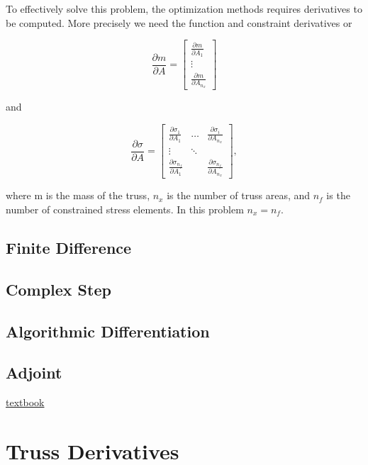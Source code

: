 \documentclass{article}
\begin{document}
To effectively solve this problem, the optimization methods requires derivatives to be computed. More precisely we need the function  and constraint derivatives or 


\begin{equation}
\frac{\partial m}{\partial A}=
\begin{bmatrix} 
\frac{\partial m}{\partial A_1} \\
\vdots \\
\frac{\partial m}{\partial A_{n_x}}
\end{bmatrix}
\end{equation}

and 

\begin{equation}
\frac{\partial \sigma}{\partial A}=
\begin{bmatrix} 
\frac{\partial \sigma_1}{\partial A_1} & \dots & \frac{\partial \sigma_i}{\partial A_{n_x}} \\
\vdots & \ddots & \\
\frac{\partial \sigma_{n_f}}{\partial A_1} &        & \frac{\partial \sigma_{n_f}}{\partial A_{n_x}} 
\end{bmatrix},
\end{equation}

where m is the mass of the truss, $n_x$ is the number of truss areas, and $n_f$ is the number of constrained stress elements. In this problem $n_x=n_f$.

\subsection*{Finite Difference}

\subsection*{Complex Step}

\subsection*{Algorithmic Differentiation}

\subsection*{Adjoint}




\href{https://byu.box.com/shared/static/17bqmaop0v1o0fwqg1etx7dofl6ad35t.pdf}{textbook} 
\section*{Truss Derivatives}
\end{document}
